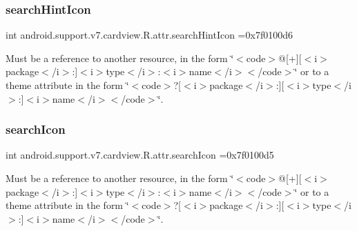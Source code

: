 \subsubsection{\texorpdfstring{search\+Hint\+Icon}{searchHintIcon}}
{\footnotesize\ttfamily int android.\+support.\+v7.\+cardview.\+R.\+attr.\+search\+Hint\+Icon =0x7f0100d6\hspace{0.3cm}{\ttfamily [static]}}

Must be a reference to another resource, in the form \char`\"{}$<$code$>$@\mbox{[}+\mbox{]}\mbox{[}$<$i$>$package$<$/i$>$\+:\mbox{]}$<$i$>$type$<$/i$>$\+:$<$i$>$name$<$/i$>$$<$/code$>$\char`\"{} or to a theme attribute in the form \char`\"{}$<$code$>$?\mbox{[}$<$i$>$package$<$/i$>$\+:\mbox{]}\mbox{[}$<$i$>$type$<$/i$>$\+:\mbox{]}$<$i$>$name$<$/i$>$$<$/code$>$\char`\"{}. \mbox{\label{classandroid_1_1support_1_1v7_1_1cardview_1_1R_1_1attr_a50c88825d8b7297a04320d1b339090dd}} 
\subsubsection{\texorpdfstring{search\+Icon}{searchIcon}}
{\footnotesize\ttfamily int android.\+support.\+v7.\+cardview.\+R.\+attr.\+search\+Icon =0x7f0100d5\hspace{0.3cm}{\ttfamily [static]}}

Must be a reference to another resource, in the form \char`\"{}$<$code$>$@\mbox{[}+\mbox{]}\mbox{[}$<$i$>$package$<$/i$>$\+:\mbox{]}$<$i$>$type$<$/i$>$\+:$<$i$>$name$<$/i$>$$<$/code$>$\char`\"{} or to a theme attribute in the form \char`\"{}$<$code$>$?\mbox{[}$<$i$>$package$<$/i$>$\+:\mbox{]}\mbox{[}$<$i$>$type$<$/i$>$\+:\mbox{]}$<$i$>$name$<$/i$>$$<$/code$>$\char`\"{}. \mbox{\label{classandroid_1_1support_1_1v7_1_1cardview_1_1R_1_1attr_a4054d03c18a6e9d5e84784de333be406}} 
